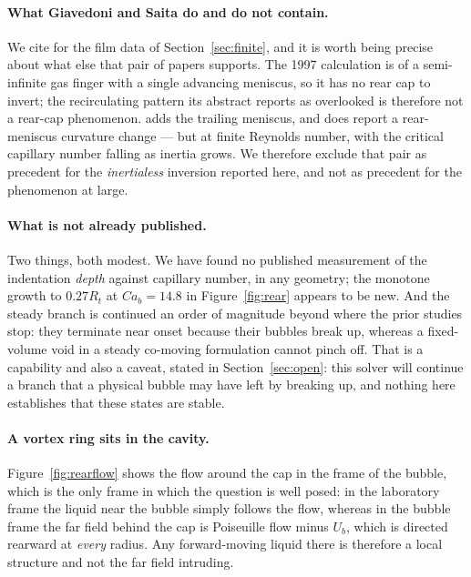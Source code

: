 \documentclass[11pt,a4paper]{article}
\begin{document}
\paragraph{What Giavedoni and Saita do and do not contain.} We cite
\citet{giavedoni1997axisymmetric} for the film data of
Section~\ref{sec:finite}, and it is worth being precise about what else that
pair of papers supports. The 1997 calculation is of a semi-infinite gas finger
with a single advancing meniscus, so it has no rear cap to invert; the
recirculating pattern its abstract reports as overlooked is therefore not a
rear-cap phenomenon. \citet{giavedoni1999rear} adds the trailing meniscus, and
does report a rear-meniscus curvature change --- but at finite Reynolds
number, with the critical capillary number falling as inertia grows. We
therefore exclude that pair as precedent for the \emph{inertialess} inversion
reported here, and not as precedent for the phenomenon at large.

\paragraph{What is not already published.} Two things, both modest. We have
found no published measurement of the indentation \emph{depth} against
capillary number, in any geometry; the monotone growth to $0.27R_t$ at
$Ca_b=14.8$ in Figure~\ref{fig:rear} appears to be new. And the steady branch
is continued an order of magnitude beyond where the prior studies stop: they
terminate near onset because their bubbles break up, whereas a fixed-volume
void in a steady co-moving formulation cannot pinch off. That is a capability
and also a caveat, stated in Section~\ref{sec:open}: this solver will continue
a branch that a physical bubble may have left by breaking up, and nothing here
establishes that these states are stable.

\paragraph{A vortex ring sits in the cavity.} Figure~\ref{fig:rearflow} shows
the flow around the cap in the frame of the bubble, which is the only frame in
which the question is well posed: in the laboratory frame the liquid near the
bubble simply follows the flow, whereas in the bubble frame the far field
behind the cap is Poiseuille flow minus $U_b$, which is directed rearward at
\emph{every} radius. Any forward-moving liquid there is therefore a local
structure and not the far field intruding.
\end{document}
